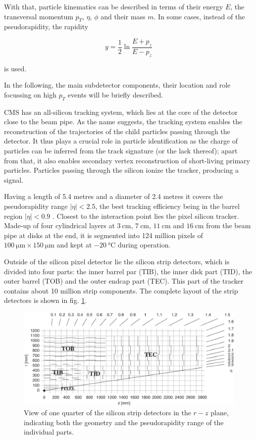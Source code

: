 With that, particle kinematics can be described in terms of their energy $E$, the transversal momentum $p_T$, $\eta$, $\phi$ and their mass $m$. In some cases, instead of the pseudorapidity, the rapidity

\begin{equation*}
	y = \frac{1}{2}\ln\frac{E+p_z}{E-p_z}
\end{equation*}

is used.

In the following, the main subdetector components, their location and role focussing on high $p_T$ events will be briefly described.


CMS has an all-silicon tracking system, which lies at the core of the detector close to the beam pipe. As the name suggests, the tracking system enables the reconstruction of the trajectories of the child particles passing through the detector. It thus plays a crucial role in particle identification as the charge of particles can be inferred from the track signature (or the lack thereof); apart from that, it also enables secondary vertex reconstruction of short-living primary particles. Particles passing through the silicon ionize the tracker, producing a signal.

Having a length of 5.4 metres and a diameter of 2.4 metres it covers the pseudorapidity range $|\eta|<2.5$, the best tracking efficiency being in the barrel region $|\eta| < 0.9$ \cite{Veszpremi_2014}. Closest to the interaction point lies the pixel silicon tracker. Made-up of four cylindrical layers at $\SI{3}{\centi\meter}$, $\SI{7}{\centi\meter}$, $\SI{11}{\centi\meter}$ and $\SI{16}{\centi\meter}$ from the beam pipe at disks at the end, it is segmented into 124 million pixels of $\SI{100}{\micro\meter} \times \SI{150}{\micro\meter}$ and kept at $\SI{-20}{\degreeCelsius}$ during operation.

Outside of the silicon pixel detector lie the silicon strip detectors, which is divided into four parts: the inner barrel par (TIB), the inner disk part (TID), the outer barrel (TOB) and the outer endcap part (TEC). This part of the tracker contains about 10 million strip components. The complete layout of the strip detectors is shown in fig. \ref{fig:strip_tracker}.

\begin{figure}[h!]
	\centering
	\includegraphics[width=0.8\linewidth]{figures/experiment/StripTracker}
	\caption{View of one quarter of the silicon strip detectors in the $r-z$ plane, indicating both the geometry and the pseudorapidity range of the individual parts. \cite{Azzurri:914891}}
	\label{fig:strip_tracker}
\end{figure}

